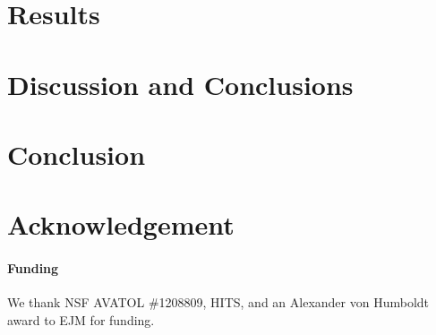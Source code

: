 \documentclass{bioinfo}
\begin{document}
\section{Results}

\section{Discussion and Conclusions}

\section{Conclusion}

\section*{Acknowledgement}

\paragraph{Funding\textcolon} We thank NSF AVATOL \#1208809, HITS, and an Alexander von Humboldt award to EJM for funding.

\end{document}
